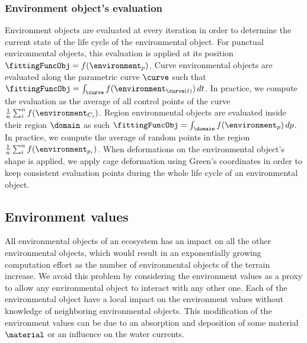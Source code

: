 \subsubsection{Environment object's evaluation}
\label{sec:semantic-representation_obj-evaluation}
Environment objects are evaluated at every iteration in order to determine the current state of the life cycle of the environmental object. For punctual environmental objects, this evaluation is applied at its position $\fittingFuncObj = f(\environment_{p})$. Curve environmental objects are evaluated along the parametric curve $\curve$ such that $\fittingFuncObj = \int_{\curve} f(\environment_{\curve(t)}) \,dt$. In practice, we compute the evaluation as the average of all control points of the curve $\frac{1}{n} \sum_{i}^{n}{f(\environment_{C_i})}$.
Region environmental objects are evaluated inside their region $\domain$ as such $\fittingFuncObj = \int_{\domain} f(\environment_p) \,dp$. In practice, we compute the average of random points in the region $\frac{1}{n} \sum_{i}^{n}{f(\environment_{p_i})}$. When deformations on the environmental object's shape is applied, we apply cage deformation using Green's coordinates in order to keep consistent evaluation points during the whole life cycle of an environmental object.


\subsection{Environment values}
\label{sec:semantic-representation_communication}
All environmental objects of an ecosystem has an impact on all the other environmental objects, which would result in an exponentially growing computation effort as the number of environmental objects of the terrain increase. We avoid this problem by considering the environment values as a proxy to allow any environmental object to interact with any other one. Each of the environmental object have a local impact on the environment values without knowledge of neighboring environmental objects. This modification of the environment values can be due to an absorption and deposition of some material $\material$ or an influence on the water currents.


